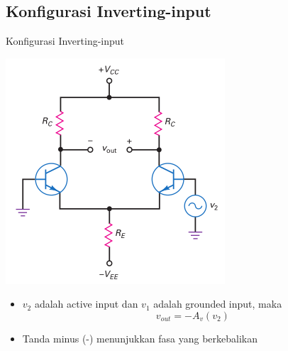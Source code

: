 \documentclass[aspectratio=169]{beamer}
\begin{document}
\subsection{Konfigurasi Inverting-input}
\begin{frame}{Konfigurasi Inverting-input}
	\begin{multicols}{2}
		\begin{center}
			\includegraphics[height=0.7\textheight]{gambar/01.diff-amp/01.inverting_input+differential_output}
		\end{center}
		\columnbreak
		\begin{itemize}
			\item $ v_2 $ adalah active input dan $ v_1 $ adalah grounded input, maka
			\begin{equation} \label{pers.4}
				v_{out} = -A_v(v_2)
			\end{equation}
			\item Tanda minus (-) menunjukkan fasa yang berkebalikan
		\end{itemize}
	\end{multicols}
\end{frame}
\end{document}
